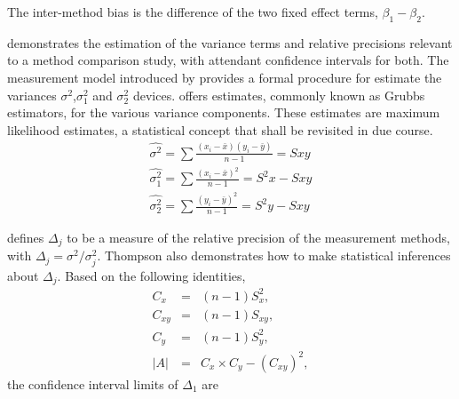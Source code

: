 \documentclass[12pt, a4paper]{report}
\theoremstyle{plain}
\theoremstyle{definition}
\theoremstyle{remark}
\begin{document}
	
		The inter-method bias is the difference of the two fixed effect terms, $\beta_{1}-\beta_{2}$.
		
		\citet{Kinsella} demonstrates the estimation of the variance terms and relative precisions relevant to a method comparison study, with attendant confidence intervals for both. The measurement model introduced by \citet{Grubbs48,Grubbs73} provides a formal procedure for estimate the variances $\sigma^2$,$\sigma^2_{1}$ and $\sigma^2_{2}$ devices. \citet{Grubbs48} offers estimates, commonly known as Grubbs estimators, for the various variance components. These estimates are maximum likelihood estimates, a statistical concept that shall be revisited in due course.
		\begin{eqnarray*}
			\hat{\sigma^{2}} = \sum{\frac{(x_{i}-\bar{x})(y_{i}-\bar{y})}{n-1}} = Sxy\\
			\hat{\sigma^{2}_{1}} = \sum{\frac{(x_{i}-\bar{x})^{2}}{n-1}} =S^{2}x - Sxy  \\
			\hat{\sigma^{2}_{2}} =
			\sum{\frac{(y_{i}-\bar{y})^{2}}{n-1}} = S^{2}y - Sxy
		\end{eqnarray*}
		
		
		\citet{Thompson} defines $\Delta_{j}$ to be a measure of the
		relative precision of the measurement methods, with $\Delta_{j}=
		\sigma^2/\sigma^2_{j}$. Thompson also demonstrates how to make statistical inferences about $\Delta_{j}$.
		Based on the following identities,
		\begin{eqnarray*}
			C_{x}&=&(n-1)S^2_{x},\nonumber\\
			C_{xy}&=&(n-1)S_{xy},\nonumber\\
			C_{y}&=&(n-1)S^2_{y},\nonumber\\
			|A| &=& C_{x}\times C_{y} - (C_{xy})^2,\nonumber
		\end{eqnarray*}
		\noindent the confidence interval limits of $\Delta_{1}$ are
		
\end{document}
